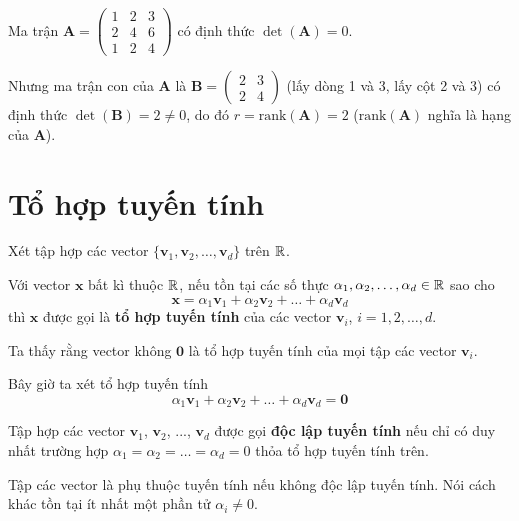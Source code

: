 \begin{example}
    Ma trận $\bm{A} = \begin{pmatrix}
        1 & 2 & 3 \\ 2 & 4 & 6 \\ 1 & 2 & 4
    \end{pmatrix}$ có định thức $\det(\bm{A}) = 0$. 
    
    Nhưng ma trận con của $\bm{A}$ là $\bm{B} = \begin{pmatrix}2 & 3 \\ 2 & 4\end{pmatrix}$ (lấy dòng 1 và 3, lấy cột 2 và 3) có định thức $\det(\bm{B}) = 2 \neq 0$, do đó $r = \text{rank}(\bm{A}) = 2$ ($\text{rank}(\bm{A})$ nghĩa là hạng của $\bm{A}$).
\end{example}


\section{Tổ hợp tuyến tính}

Xét tập hợp các vector $\{\bm{v}_1, \bm{v}_2, \ldots, \bm{v}_d\}$ trên $\mathbb{R}$.

\begin{definition}
Với vector $\bm{x}$ bất kì thuộc $\mathbb{R}$, nếu tồn tại các số thực $\alpha_1, \alpha_2, \ldots, \alpha_d \in \mathbb{R}$ sao cho
\[\bm{x} = \alpha_1 \bm{v}_1 + \alpha_2 \bm{v}_2 + \ldots + \alpha_d \bm{v}_d\]
thì $\bm{x}$ được gọi là \textbf{tổ hợp tuyến tính} của các vector $\bm{v}_i$, $i = 1, 2, \ldots, d$.
\end{definition}

Ta thấy rằng vector không $\bm{0}$ là tổ hợp tuyến tính của mọi tập các vector $\bm{v}_i$.

Bây giờ ta xét tổ hợp tuyến tính
\[\alpha_1 \bm{v}_1 + \alpha_2 \bm{v}_2 + \ldots + \alpha_d \bm{v}_d = \bm{0}\]

\begin{definition}
    Tập hợp các vector $\bm{v}_1$, $\bm{v}_2$, ..., $\bm{v}_d$ được gọi \textbf{độc lập tuyến tính} nếu
    chỉ có duy nhất trường hợp $\alpha_1 = \alpha_2 = \ldots = \alpha_d = 0$ thỏa tổ hợp tuyến tính trên.    
\end{definition}

\begin{definition}
    Tập các vector là phụ thuộc tuyến tính nếu không độc lập tuyến tính.
    Nói cách khác tồn tại ít nhất một phần tử $\alpha_i \neq 0$.
\end{definition}

